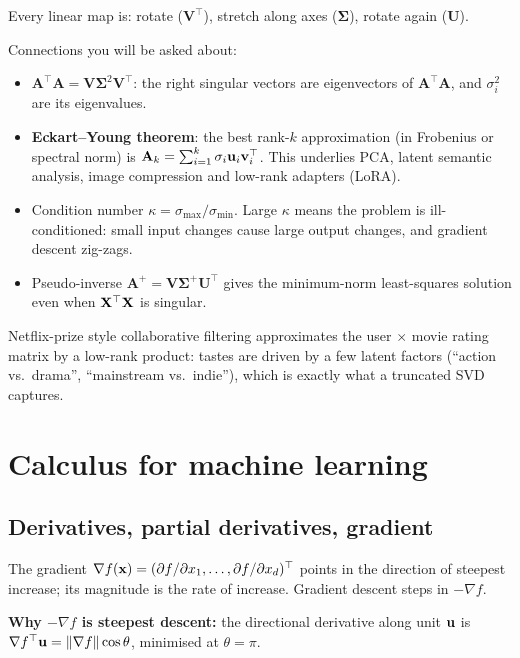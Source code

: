 \begin{intuition}
Every linear map is: rotate ($\mathbf{V}^\top$), stretch along axes ($\bm\Sigma$), rotate again ($\mathbf{U}$).
\end{intuition}

Connections you will be asked about:
\begin{itemize}
  \item $\mathbf{A}^\top\mathbf{A}=\mathbf{V}\bm\Sigma^2\mathbf{V}^\top$: the right singular vectors are eigenvectors of $\mathbf{A}^\top\mathbf{A}$, and $\sigma_i^2$ are its eigenvalues.
  \item \textbf{Eckart--Young theorem}: the best rank-$k$ approximation (in Frobenius or spectral norm) is $\mathbf{A}_k=\sum_{i=1}^k\sigma_i\mathbf{u}_i\mathbf{v}_i^\top$. This underlies PCA, latent semantic analysis, image compression and low-rank adapters (LoRA).
  \item Condition number $\kappa=\sigma_{\max}/\sigma_{\min}$. Large $\kappa$ means the problem is ill-conditioned: small input changes cause large output changes, and gradient descent zig-zags.
  \item Pseudo-inverse $\mathbf{A}^+=\mathbf{V}\bm\Sigma^+\mathbf{U}^\top$ gives the minimum-norm least-squares solution even when $\mathbf{X}^\top\mathbf{X}$ is singular.
\end{itemize}

\begin{realworld}
Netflix-prize style collaborative filtering approximates the user $\times$ movie rating matrix by a low-rank product: tastes are driven by a few latent factors (``action vs.\ drama'', ``mainstream vs.\ indie''), which is exactly what a truncated SVD captures.
\end{realworld}

\section{Calculus for machine learning}

\subsection{Derivatives, partial derivatives, gradient}
The gradient $\nabla f(\mathbf{x})=(\partial f/\partial x_1,\dots,\partial f/\partial x_d)^\top$ points in the direction of steepest increase; its magnitude is the rate of increase. Gradient descent steps in $-\nabla f$.

\textbf{Why $-\nabla f$ is steepest descent:} the directional derivative along unit $\mathbf{u}$ is $\nabla f^\top\mathbf{u}=\|\nabla f\|\cos\theta$, minimised at $\theta=\pi$.

